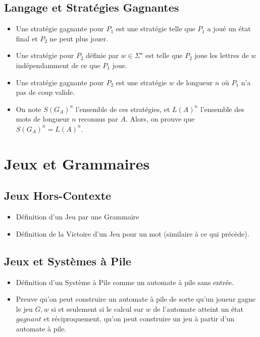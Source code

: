 \documentclass{cours}
\begin{document}
\subsection{Langage et Stratégies Gagnantes}
\begin{itemize}
    \item Une stratégie gagnante pour $P_{1}$ est une stratégie telle que $P_{1}$ a joué un état final et $P_{2}$ ne peut plus jouer.
    \item Une stratégie pour $P_{2}$ définie par $w \in \Sigma^{\star}$ est telle que $P_{2}$ joue les lettres de $w$ indépendamment de ce que $P_{1}$ joue. 
    \item Une stratégie gagnante pour $P_{2}$ est une stratégie $w$ de longueur $n$ où $P_{1}$ n'a pas de coup valide.
    \item On note $S(G_{A})^{n}$ l'ensemble de ces stratégies, et $L(A)^{n}$ l'ensemble des mots de longueur $n$ reconnus par $A$. Alors, on prouve que $S(G_{A})^{n} = L(A)^{n}$.
\end{itemize}

\section{Jeux et Grammaires}
\subsection{Jeux Hors-Contexte}
\begin{itemize}
    \item Définition d'un Jeu par une Grammaire
    \item Définition de la Victoire d'un Jeu pour un mot (similaire à ce qui précède).
\end{itemize}

\subsection{Jeux et Systèmes à Pile}
\begin{itemize}
    \item Définition d'un Système à Pile comme un automate à pile sans entrée.
    \item Preuve qu'on peut construire un automate à pile de sorte qu'un joueur gagne le jeu $G, w$ si et seulement si le calcul sur $w$ de l'automate atteint un état $gagnant$ et réciproquement, qu'on peut construire un jeu à partir d'un automate à pile. 
\end{itemize}
\end{document}
